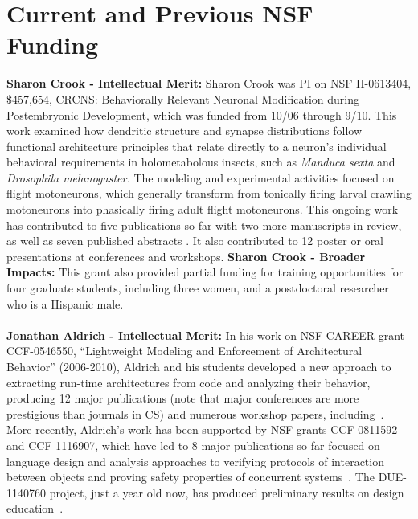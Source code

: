 \documentclass[11pt,letterpaper]{article}
\newcommand{\bfhead}[1]{\noindent \textbf{#1:}}
\begin{document}
\section{Current and Previous NSF Funding}
\bfhead{Sharon Crook - Intellectual Merit} Sharon Crook was PI on NSF II-0613404, \$457,654, CRCNS: Behaviorally Relevant Neuronal Modification during Postembryonic Development, which was funded from 10/06 through 9/10. 
This work examined how dendritic structure and synapse distributions follow functional architecture principles that relate directly to a neuron's individual behavioral requirements in holometabolous insects, such as \textit{Manduca sexta} and \textit{Drosophila melanogaster.} 
The modeling and experimental activities focused on flight motoneurons, which generally transform from tonically firing larval crawling motoneurons into phasically firing adult flight motoneurons. 
This ongoing work has contributed to five publications so far \cite{hohensee, meseke, herrera-valdez_2012, ryglewski_2012, herrera-valdez_jcns_2013} with two more manuscripts in review, 
as well as seven published abstracts \cite{jennings_2007, herrera-valdez_2009, berger_2009, herrera-valdez_2010, smith_2011, berger_2012, berger_2013}. 
It also contributed to 12 poster or oral presentations at conferences and workshops. 
\bfhead{Sharon Crook - Broader Impacts} This grant also provided partial funding for training opportunities for four graduate students, including three women, and a postdoctoral researcher who is a Hispanic male. 
\\\\
\bfhead{Jonathan Aldrich - Intellectual Merit} In his work on NSF CAREER grant CCF-0546550, ``Lightweight Modeling and Enforcement of Architectural Behavior'' (2006-2010), 
Aldrich and his students developed a new approach to extracting run-time architectures from code and analyzing their behavior, 
producing 12 major publications (note that major conferences are more prestigious than journals in CS) and numerous workshop papers, including~\cite{AAC07,bierhoff07:modular_typestate_checking,AAN+08,AA07a,AA07b,AA08d,AA09a,AA09b,AB10}.
More recently, Aldrich's work has been supported by NSF grants CCF-0811592 and CCF-1116907, 
which have led to 8 major publications so far focused on language design and analysis approaches to verifying protocols of interaction between objects and proving safety
properties of concurrent systems~\cite{beckman08:verifying_atomic,bierhoff09:plural,JA09,aldrich11:plaid,sunshine11:plaid,naden12:borrowing,hannesPlural,PradelAPI13}.  
The DUE-1140760 project, just a year old now, has produced preliminary results on design education~\cite{Cai13}.
\end{document}
